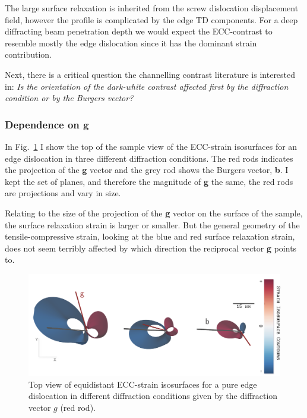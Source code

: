 The large surface relaxation is inherited from the screw dislocation displacement field, however the profile is complicated by the edge TD components. For a deep diffracting beam penetration depth we would expect the ECC-contrast to resemble mostly the edge dislocation since it has the dominant strain contribution. 


Next, there is a critical question the channelling contrast literature is interested in: \textit{Is the orientation of the dark-white contrast affected first by the diffraction condition or by the Burgers vector?}

\subsubsection{Dependence on \texorpdfstring{$\mathbf{g}$}{g}}
In Fig.~\ref{fig:gdependence} I show the top of the sample view of the ECC-strain isosurfaces for an edge dislocation in three different diffraction conditions. The red rods indicates the projection of the \textbf{g} vector and the grey rod shows the Burgers vector, \textbf{b}. I kept the set of planes, and therefore the magnitude of \textbf{g} the same, the red rods are projections and vary in size. 

Relating to the size of the projection of the \textbf{g} vector on the surface of the sample, the surface relaxation strain is larger or smaller. But the general geometry of the tensile-compressive strain, looking at the blue and red surface relaxation strain, does not seem terribly affected by which direction the reciprocal vector \textbf{g} points to. 

\begin{figure}[ht]
    \centering
    \includegraphics[width=0.95\linewidth]{Figures/gdependence.png}
    \caption[Edge TD ECC-strain in different orientations.]{Top view of equidistant  ECC-strain isosurfaces for a pure edge dislocation in different diffraction conditions given by the diffraction vector $g$ (red rod).  }
    \label{fig:gdependence}
\end{figure}

